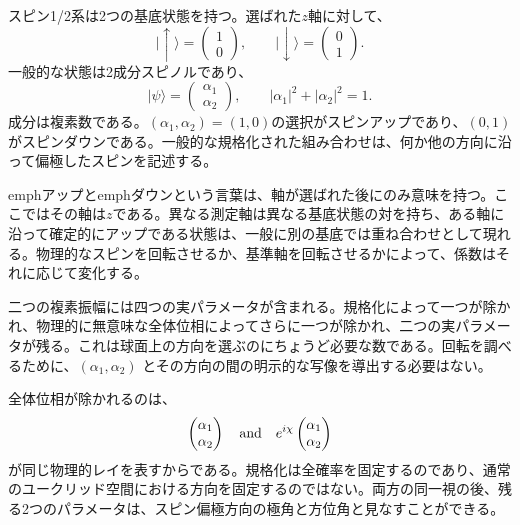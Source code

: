スピン1/2系は2つの基底状態を持つ。選ばれた\(z\)軸に対して、
\begin{equation}
\lvert\uparrow\rangle=
\begin{pmatrix}1\\0\end{pmatrix},
\qquad
\lvert\downarrow\rangle=
\begin{pmatrix}0\\1\end{pmatrix}.
\end{equation}
一般的な状態は2成分スピノルであり、
\begin{equation}
\lvert\psi\rangle=
\begin{pmatrix}\alpha_1\\\alpha_2\end{pmatrix},
\qquad
|\alpha_1|^2+|\alpha_2|^2=1.
\label{eq:l3-spinor}
\end{equation}
成分は複素数である。\((\alpha_1,\alpha_2)=(1,0)\)の選択がスピンアップであり、\((0,1)\)がスピンダウンである。一般的な規格化された組み合わせは、何か他の方向に沿って偏極したスピンを記述する。

emph{アップ}とemph{ダウン}という言葉は、軸が選ばれた後にのみ意味を持つ。ここではその軸は\(z\)である。異なる測定軸は異なる基底状態の対を持ち、ある軸に沿って確定的にアップである状態は、一般に別の基底では重ね合わせとして現れる。物理的なスピンを回転させるか、基準軸を回転させるかによって、係数はそれに応じて変化する。

二つの複素振幅には四つの実パラメータが含まれる。規格化によって一つが除かれ、物理的に無意味な全体位相によってさらに一つが除かれ、二つの実パラメータが残る。これは球面上の方向を選ぶのにちょうど必要な数である。回転を調べるために、\((\alpha_1,\alpha_2)\) とその方向の間の明示的な写像を導出する必要はない。

全体位相が除かれるのは、
\begin{equation}
\begin{pmatrix}\alpha_1\\\alpha_2\end{pmatrix}
\quad\hbox{and}\quad
e^{i\chi}
\begin{pmatrix}\alpha_1\\\alpha_2\end{pmatrix}
\end{equation}
が同じ物理的レイを表すからである。規格化は全確率を固定するのであり、通常のユークリッド空間における方向を固定するのではない。両方の同一視の後、残る2つのパラメータは、スピン偏極方向の極角と方位角と見なすことができる。

